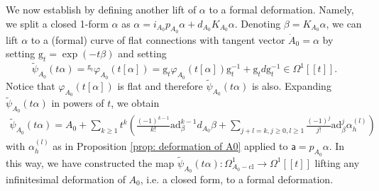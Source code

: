 \documentclass[11pt,a4paper]{amsart}
\theoremstyle{plain} %
\theoremstyle{definition}
\theoremstyle{remark}
\newcommand{\g}{\mathfrak{g}}
\newcommand{\mr}{\mathrm}
\newcommand{\sfa}{\mathsf{a}}
\newcommand{\til}{\widetilde}
\newcommand{\sfg}{\mathrm{g}} %
\begin{document}
     We now establish by defining another lift of $\alpha$ to a formal deformation.
    Namely, we split a closed 1-form $\alpha$ as $\alpha = i_{A_0}p_{A_0}\alpha + d_{A_0}K_{A_0}\alpha$. Denoting  $\beta =  K_{A_0}\alpha$, we can lift $\alpha$ { to} a (formal) curve of flat connections with tangent vector $\dot{A}_0 = \alpha$ by setting $\sfg_{t} = \exp(-  t\beta)$ and  setting
    \begin{equation}
        \til{\psi}_{A_0}(t\alpha) = {}^{\sfg_t}\varphi_{A_0}(t[\alpha]) = \sfg_t {\varphi}_{A_0}(t[\alpha])\sfg_t^{-1} + \sfg_t d \sfg_t^{-1}  \in \Omega^1[[t]].
    \end{equation}
    Notice that $\varphi_{A_0}(t[\alpha])$ is flat and therefore $\til{\psi}_{A_0}(t\alpha)$ is also.
    Expanding $\til{\psi}_{A_0}(t\alpha)$ in powers of $t$, we obtain %
\begin{multline}
    \til{\psi}_{A_0}(t\alpha) = A_0 + \sum_{k\geq 1}t^k\left(\frac{
    (-1)^{k-1}
    }{k!}\mathrm{ad}_\beta^{k-1} d_{A_0}\beta +\sum_{j+l = k, j\geq 0, l\geq 1} \frac{
    (-1)^{j}
    }{j!}\mathrm{ad}_{\beta}^j \alpha_h^{(l)}\right) 
\end{multline}
with $\alpha_h^{(l)}$ as in Proposition \ref{prop: deformation of A0} applied to $\sfa=p_{A_0}\alpha$.
    In this way, we have constructed the map $\til{\psi}_{A_0}(t\alpha) \colon \Omega^1_{A_0-\mr{cl}} \to \Omega^1[[t]]$ lifting any infinitesimal deformation of $A_0$, i.e. a closed form, to a formal deformation.    
\end{document}

